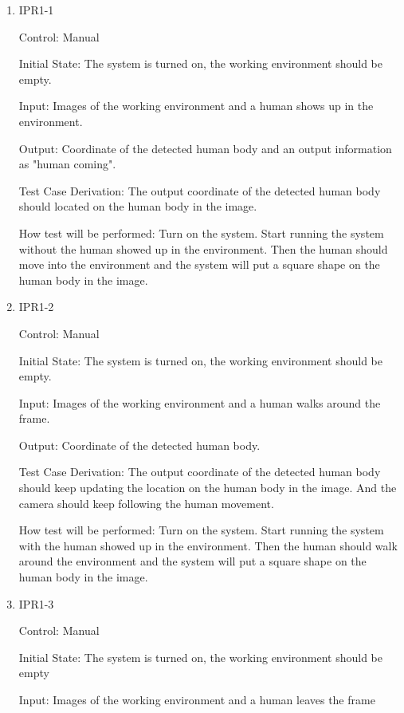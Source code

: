\documentclass[12pt, titlepage]{article}
\begin{document}
\begin{enumerate}

\item{IPR1-1\\}

Control: Manual
					
Initial State: The system is turned on, the working environment should be empty.
					
Input: Images of the working environment and a human shows up in the environment.
					
Output: Coordinate of the detected human body and an output information as "human coming".

Test Case Derivation: The output coordinate of the detected human body should located on the human body in the image.
					
How test will be performed: Turn on the system. Start running the system without the human showed up in the environment. Then the human should move into the environment and the system will put a square shape on the human body in the image.

\item{IPR1-2\\}

Control: Manual
					
Initial State: The system is turned on, the working environment should be empty.
					
Input: Images of the working environment and a human walks around the frame.
					
Output: Coordinate of the detected human body.

Test Case Derivation: The output coordinate of the detected human body should keep updating the location on the human body in the image. And the camera should keep following the human movement.
					
How test will be performed: Turn on the system. Start running the system with the human showed up in the environment. Then the human should walk around the environment and the system will put a square shape on the human body in the image.

\item{IPR1-3\\}

Control: Manual
					
Initial State: The system is turned on, the working environment should be empty
					
Input: Images of the working environment and a human leaves the frame
					

\end{enumerate}
\end{document}
